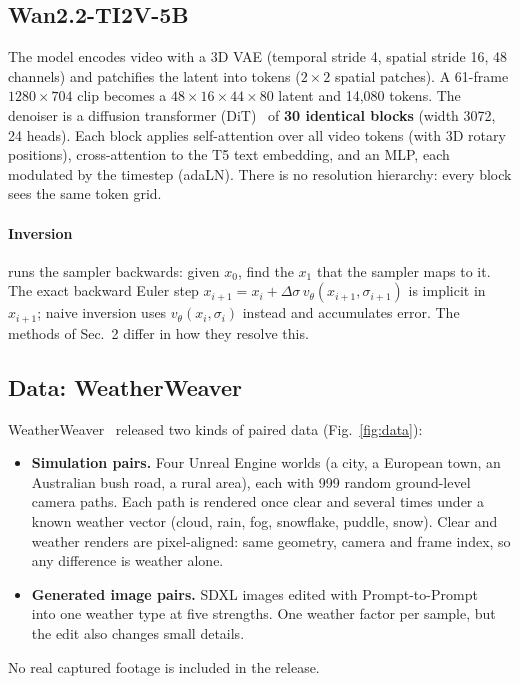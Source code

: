 \documentclass[11pt,a4paper]{article}
\begin{document}
\subsection{Wan2.2-TI2V-5B}
The model encodes video with a 3D VAE (temporal stride 4, spatial stride 16, 48 channels) and patchifies the latent into tokens ($2{\times}2$ spatial patches).
A 61-frame $1280{\times}704$ clip becomes a $48{\times}16{\times}44{\times}80$ latent and 14{,}080 tokens.
The denoiser is a diffusion transformer (DiT)~\cite{dit} of \textbf{30 identical blocks} (width 3072, 24 heads).
Each block applies self-attention over all video tokens (with 3D rotary positions), cross-attention to the T5 text embedding, and an MLP, each modulated by the timestep (adaLN).
There is no resolution hierarchy: every block sees the same token grid.

\paragraph{Inversion} runs the sampler backwards: given $x_0$, find the $x_1$ that the sampler maps to it.
The exact backward Euler step $x_{i+1} = x_i + \Delta\sigma\,v_\theta(x_{i+1},\sigma_{i+1})$ is implicit in $x_{i+1}$; naive inversion uses $v_\theta(x_i,\sigma_i)$ instead and accumulates error. The methods of Sec.~2 differ in how they resolve this.

\subsection{Data: WeatherWeaver}
WeatherWeaver~\cite{weatherweaver} released two kinds of paired data (Fig.~\ref{fig:data}):
\begin{itemize}
  \item \textbf{Simulation pairs.} Four Unreal Engine worlds (a city, a European town, an Australian bush road, a rural area), each with 999 random ground-level camera paths. Each path is rendered once clear and several times under a known weather vector (cloud, rain, fog, snowflake, puddle, snow). Clear and weather renders are pixel-aligned: same geometry, camera and frame index, so any difference is weather alone.
  \item \textbf{Generated image pairs.} SDXL images edited with Prompt-to-Prompt~\cite{p2p} into one weather type at five strengths. One weather factor per sample, but the edit also changes small details.
\end{itemize}
No real captured footage is included in the release.
\end{document}
